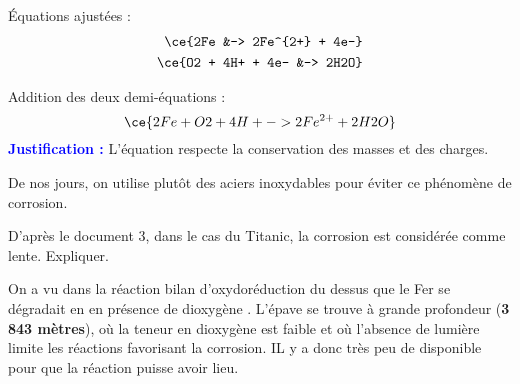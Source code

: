 \documentclass[answers]{exam}
\begin{document}
\begin{questions}
\begin{solution}
    Équations ajustées :
    \begin{align*}
    \ce{2Fe &-> 2Fe^{2+} + 4e-} \\
    \ce{O2 + 4H+ + 4e- &-> 2H2O}
    \end{align*}
    
    Addition des deux demi-équations :
    \[
    \ce{2Fe + O2 + 4H+ -> 2Fe^{2+} + 2H2O}
    \]
    \textcolor{blue}{\textbf{Justification :}} L'équation respecte la conservation des masses et des charges.
    \end{solution}

  \question[2] De nos jours, on utilise plutôt des aciers inoxydables pour éviter ce phénomène de corrosion.
  \question[0.5] D'après le document 3, dans le cas du Titanic, la corrosion est considérée comme lente. Expliquer.

  \begin{solution}
    On a vu dans la réaction bilan d'oxydoréduction du dessus que le Fer se dégradait en  en présence de dioxygène . L'épave se trouve à grande profondeur (\textbf{3 843 mètres}), où la teneur en dioxygène est faible et où l'absence de lumière limite les réactions favorisant la corrosion. IL y a donc très peu de  disponible pour que la réaction puisse avoir lieu. 
    \end{solution}

\end{questions}
\end{document}
